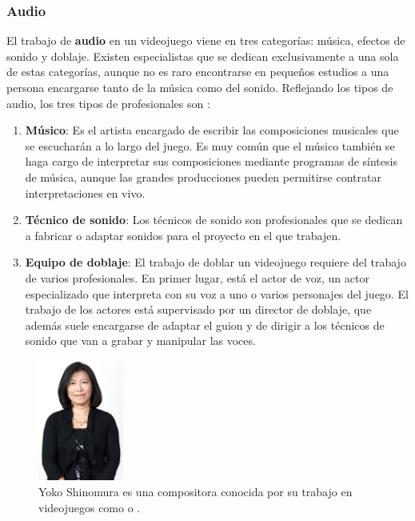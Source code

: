 \subsubsection{Audio}
El trabajo de \textbf{audio} en un videojuego viene en tres categorías: música, efectos de sonido y doblaje. Existen especialistas que se dedican exclusivamente a una sola de estas categorías, aunque no es raro encontrarse en pequeños estudios a una persona encargarse tanto de la música como del sonido. Reflejando los tipos de audio, los tres tipos de profesionales son \cite{development_and_production}:
\begin{enumerate}
\item \textbf{Músico}: Es el artista encargado de escribir las composiciones musicales que se escucharán a lo largo del juego. Es muy común que el músico también se haga cargo de interpretar sus composiciones mediante programas de síntesis de música, aunque las grandes producciones pueden permitirse contratar interpretaciones en vivo.
\item \textbf{Técnico de sonido}: Los técnicos de sonido son profesionales que se dedican a fabricar o adaptar sonidos para el proyecto en el que trabajen.
\item \textbf{Equipo de doblaje}: El trabajo de doblar un videojuego requiere del trabajo de varios profesionales. En primer lugar, está el actor de voz, un actor especializado que interpreta con su voz a uno o varios personajes del juego. El trabajo de los actores está supervisado por un director de doblaje, que además suele encargarse de adaptar el guion y de dirigir a los técnicos de sonido que van a grabar y manipular las voces.
\end{enumerate}
\begin{figure}[h]
    \centering
    \includegraphics[width=0.25\textwidth]{images/estadodelarte/desarrollo/yoko-shimomura}
    \caption{Yoko Shinomura es una compositora conocida por su trabajo en videojuegos como  o .}
\end{figure}

